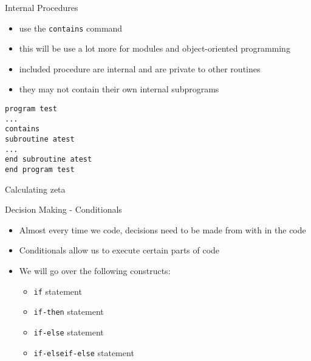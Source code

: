 \documentclass{beamer}
\begin{document}
\begin{frame}{Internal Procedures}
  
  \begin{itemize}
    \item use the \texttt{contains} command
    \vfill\item this will be use a lot more for modules and object-oriented programming
    \vfill\item included procedure are internal and are private to other routines
    \vfill\item they may not contain their own internal subprograms
  \end{itemize}
  \vfill
  \texttt{program test} \\
  \texttt{...} \\
  \texttt{contains} \\
  \texttt{subroutine atest} \\
  \texttt{...} \\
  \texttt{end subroutine atest} \\
  \texttt{end program test}

\end{frame}
\begin{frame}[allowframebreaks]{Calculating zeta}
  \begin{scriptsize}
    
  \end{scriptsize}
\end{frame}
\begin{frame}{Decision Making - Conditionals}

  \begin{itemize}
    \item Almost every time we code, decisions need to be made from with in the code
    \vfill\item Conditionals allow us to execute certain parts of code
    \vfill\item We will go over the following constructs:
    \begin{itemize}
      \item \texttt{if} statement
      \item \texttt{if-then} statement
      \item \texttt{if-else} statement
      \item \texttt{if-elseif-else} statement
    \end{itemize}
  \end{itemize}

\end{frame}
\end{document}
